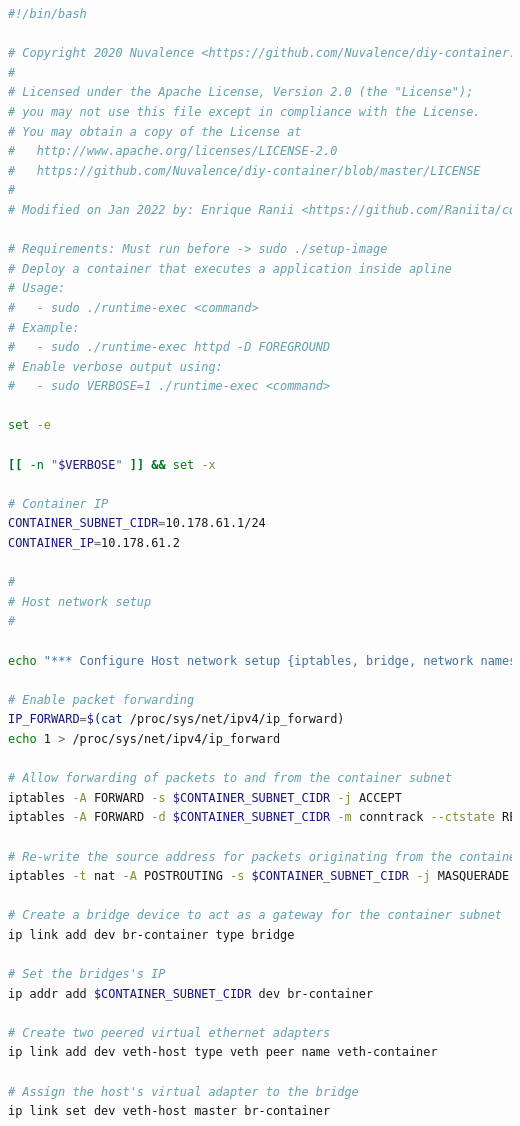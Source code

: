 \documentclass[12pt]{article}
\begin{document}
	\begin{lstlisting}[language=bash,caption={Ejecución de runtime basado en imagen de Alpine}]
#!/bin/bash

# Copyright 2020 Nuvalence <https://github.com/Nuvalence/diy-container.git>
# 
# Licensed under the Apache License, Version 2.0 (the "License");
# you may not use this file except in compliance with the License.
# You may obtain a copy of the License at
#   http://www.apache.org/licenses/LICENSE-2.0
#   https://github.com/Nuvalence/diy-container/blob/master/LICENSE
#
# Modified on Jan 2022 by: Enrique Ranii <https://github.com/Raniita/container-alpine.git>

# Requirements: Must run before -> sudo ./setup-image
# Deploy a container that executes a application inside apline
# Usage:
#   - sudo ./runtime-exec <command>
# Example:
#   - sudo ./runtime-exec httpd -D FOREGROUND
# Enable verbose output using:
#   - sudo VERBOSE=1 ./runtime-exec <command>

set -e

[[ -n "$VERBOSE" ]] && set -x

# Container IP
CONTAINER_SUBNET_CIDR=10.178.61.1/24
CONTAINER_IP=10.178.61.2

#
# Host network setup
#

echo "*** Configure Host network setup {iptables, bridge, network namespace}..."

# Enable packet forwarding
IP_FORWARD=$(cat /proc/sys/net/ipv4/ip_forward)
echo 1 > /proc/sys/net/ipv4/ip_forward

# Allow forwarding of packets to and from the container subnet
iptables -A FORWARD -s $CONTAINER_SUBNET_CIDR -j ACCEPT
iptables -A FORWARD -d $CONTAINER_SUBNET_CIDR -m conntrack --ctstate RELATED,ESTABLISHED -j ACCEPT

# Re-write the source address for packets originating from the container subnet
iptables -t nat -A POSTROUTING -s $CONTAINER_SUBNET_CIDR -j MASQUERADE

# Create a bridge device to act as a gateway for the container subnet
ip link add dev br-container type bridge

# Set the bridges's IP
ip addr add $CONTAINER_SUBNET_CIDR dev br-container

# Create two peered virtual ethernet adapters
ip link add dev veth-host type veth peer name veth-container

# Assign the host's virtual adapter to the bridge
ip link set dev veth-host master br-container


\end{lstlisting}
\end{document}
